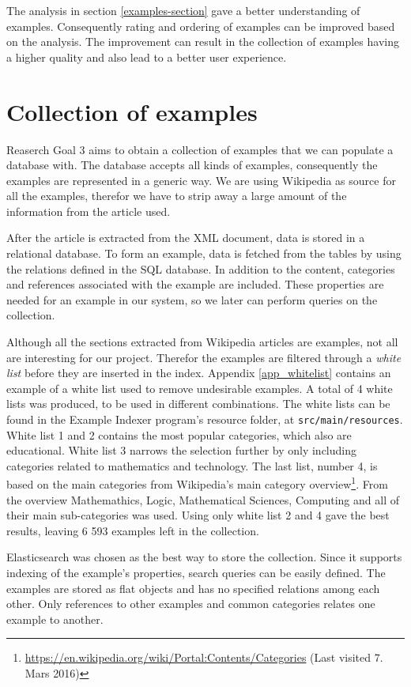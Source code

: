 The analysis in section \ref{examples-section} gave a better understanding of examples. Consequently rating and ordering of examples can be improved based on the analysis. 
The improvement can result in the collection of examples having a higher quality and also lead to a better user experience. 


\section{Collection of examples}
Reaserch Goal 3 aims to obtain a collection of examples that we can populate a database with. The database accepts all kinds of examples, consequently the examples are represented in a generic way. We are using Wikipedia as source for all the examples, therefor we have to strip away a large amount of the information from the article used. 

After the article is extracted from the XML document, data is stored in a relational database. To form an example, data is fetched from the tables by using the relations defined in the SQL database. In addition to the content, categories and references associated with the example are included. These properties are needed for an example in our system, so we later can perform queries on the collection.

Although all the sections extracted from Wikipedia articles are examples, not all are interesting for our project. Therefor the examples are filtered through a \textit{white list} before they are inserted in the index. Appendix \ref{app_whitelist} contains an example of a white list used to remove undesirable examples. A total of 4 white lists was produced, to be used in different combinations. The white lists can be found in the Example Indexer program's resource folder, at \texttt{src/main/resources}. White list 1 and 2 contains the most popular categories, which also are educational. White list 3 narrows the selection further by only including categories related to mathematics and technology. The last list, number 4, is based on the main categories from Wikipedia's main category overview\footnote{\url{https://en.wikipedia.org/wiki/Portal:Contents/Categories} (Last visited 7. Mars 2016)}. From the overview Mathemathics, Logic, Mathematical Sciences, Computing and all of their main sub-categories was used.
Using only white list 2 and 4 gave the best results, leaving 6 593 examples left in the collection.

Elasticsearch was chosen as the best way to store the collection. Since it supports indexing of the example's properties, search queries can be easily defined. The examples are stored as flat objects and has no specified relations among each other. Only references to other examples and common categories relates one example to another.

